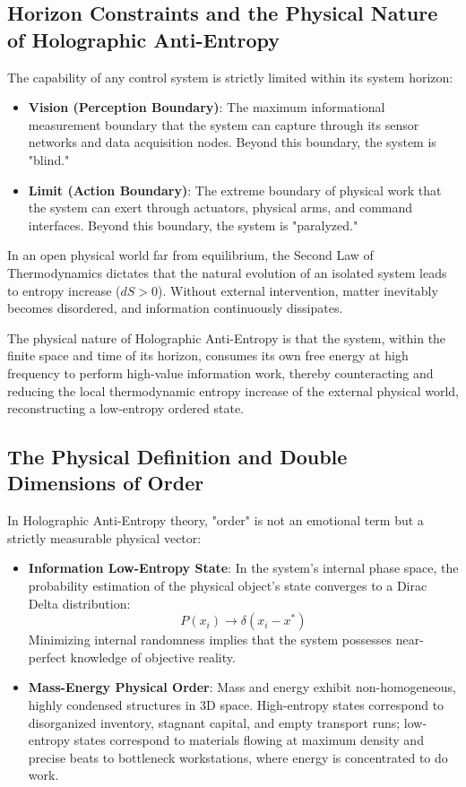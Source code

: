 \documentclass[11pt,a4paper]{article}
\begin{document}
\subsection{Horizon Constraints and the Physical Nature of Holographic Anti-Entropy}
The capability of any control system is strictly limited within its system horizon:
\begin{itemize}
    \item \textbf{Vision (Perception Boundary)}: The maximum informational measurement boundary that the system can capture through its sensor networks and data acquisition nodes. Beyond this boundary, the system is "blind."
    \item \textbf{Limit (Action Boundary)}: The extreme boundary of physical work that the system can exert through actuators, physical arms, and command interfaces. Beyond this boundary, the system is "paralyzed."
\end{itemize}

In an open physical world far from equilibrium, the Second Law of Thermodynamics dictates that the natural evolution of an isolated system leads to entropy increase ($dS > 0$). Without external intervention, matter inevitably becomes disordered, and information continuously dissipates.

The physical nature of Holographic Anti-Entropy is that the system, within the finite space and time of its horizon, consumes its own free energy at high frequency to perform high-value information work, thereby counteracting and reducing the local thermodynamic entropy increase of the external physical world, reconstructing a low-entropy ordered state.

\subsection{The Physical Definition and Double Dimensions of Order}
In Holographic Anti-Entropy theory, "order" is not an emotional term but a strictly measurable physical vector:
\begin{itemize}
    \item \textbf{Information Low-Entropy State}: In the system's internal phase space, the probability estimation of the physical object's state converges to a Dirac Delta distribution:
    \begin{equation}
        P(x_i) \longrightarrow \delta(x_i - x^*)
    \end{equation}
    Minimizing internal randomness implies that the system possesses near-perfect knowledge of objective reality.
    \item \textbf{Mass-Energy Physical Order}: Mass and energy exhibit non-homogeneous, highly condensed structures in 3D space. High-entropy states correspond to disorganized inventory, stagnant capital, and empty transport runs; low-entropy states correspond to materials flowing at maximum density and precise beats to bottleneck workstations, where energy is concentrated to do work.
\end{itemize}
\end{document}
